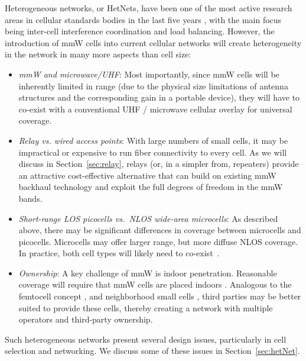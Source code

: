\documentclass[journal]{IEEEtran}
\begin{document}
Heterogeneous networks, or HetNets, have been one of the most active
research areas in cellular standards bodies in the last five years
\cite{QualcommHetNet:11,QCOM-HetNetSurvey:11,ChaAndG:08,AndrewsCDRC:12},
with the main focus being inter-cell interference coordination and load balancing.
However, the introduction of mmW cells into current cellular networks will
create heterogeneity in the network in many more aspects than cell size:
\begin{itemize}
\item \emph{mmW and microwave/UHF}:  Most importantly, since mmW cells
will be inherently limited in range (due to the physical size limitations
of antenna structures and the corresponding gain in a portable device),
they will have to co-exist
with a conventional UHF / microwave cellular overlay  for universal coverage.

\item \emph{Relay vs. wired access points}:  With large numbers of small cells,
it may be impractical or expensive to run fiber connectivity to every cell.
As we will discuss in Section~\ref{sec:relay}, relays
(or, in a simpler from, repeaters) provide an attractive
cost-effective alternative that can build on existing mmW backhaul technology
and exploit the full degrees of freedom in the mmW bands.

\item \emph{Short-range LOS picocells vs.\ NLOS wide-area microcells}:
As described above, there may be significant differences in coverage
between microcells and picocells.  Microcells may offer larger range, but
more diffuse NLOS coverage. In practice, both
cell types will likely need to co-exist~\cite{Rappaport:28NYCPenetrationLoss}.

\item \emph{Ownership}:  A key challenge of mmW is indoor penetration.
Reasonable coverage will require that mmW cells are placed indoors
\cite{Rappaport:28NYCPenetrationLoss,Nie72G-PIMRC:13}.
Analogous to the femtocell concept
\cite{Ortiz:08,ChaAndG:08,YehTLK:08,FemtoForum:10,AndrewsCDRC:12},
and neighborhood small cells \cite{Qualcomm-NSC,FordKR:13-arxiv}, third parties
may be better suited to provide these cells, thereby creating a network
with multiple operators and third-party ownership.

\end{itemize}

Such heterogeneous networks present several design issues,
particularly in cell selection and networking.  We discuss some of these issues in
Section~\ref{sec:hetNet}.
\end{document}
